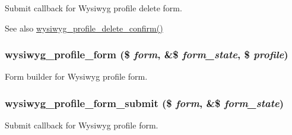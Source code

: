 \label{wysiwyg_8admin_8inc_a892dad02712e978645e6eccc2f61b294}
Submit callback for Wysiwyg profile delete form.

\begin{DoxySeeAlso}{See also}
\hyperlink{wysiwyg_8admin_8inc_a1d93944846e778af94fd0d74ec4cabe3}{wysiwyg\_\-profile\_\-delete\_\-confirm()} 
\end{DoxySeeAlso}
\hypertarget{wysiwyg_8admin_8inc_ace4bae87b031fd2ac18d20e909a3bc2c}{
\subsubsection[{wysiwyg\_\-profile\_\-form}]{\setlength{\rightskip}{0pt plus 5cm}wysiwyg\_\-profile\_\-form (\$ {\em form}, \/  \&\$ {\em form\_\-state}, \/  \$ {\em profile})}}
\label{wysiwyg_8admin_8inc_ace4bae87b031fd2ac18d20e909a3bc2c}
Form builder for Wysiwyg profile form. \hypertarget{wysiwyg_8admin_8inc_a50400446fc96a07ade71e4fb50e4045e}{
\subsubsection[{wysiwyg\_\-profile\_\-form\_\-submit}]{\setlength{\rightskip}{0pt plus 5cm}wysiwyg\_\-profile\_\-form\_\-submit (\$ {\em form}, \/  \&\$ {\em form\_\-state})}}
\label{wysiwyg_8admin_8inc_a50400446fc96a07ade71e4fb50e4045e}
Submit callback for Wysiwyg profile form.

